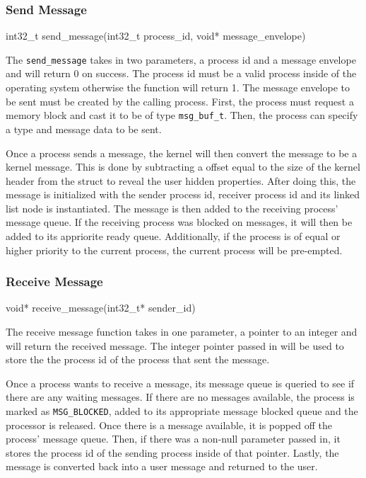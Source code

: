 \documentclass[se]{uw-wkrpt}
\begin{document}
\subsubsection{Send Message}

\begin{code}
int32_t send_message(int32_t process_id, void* message_envelope)
\end{code}

The \texttt{send\_message} takes in two parameters, a process id and a message envelope and will return 0 on success. The process id must be a valid process inside of the operating system otherwise the function will return 1. The message envelope to be sent must be created by the calling process. First, the process must request a memory block and cast it to be of type \texttt{msg\_buf\_t}. Then, the process can specify a type and message data to be sent.

Once a process sends a message, the kernel will then convert the message to be a kernel message. This is done by subtracting a offset equal to the size of the kernel header from the struct to reveal the user hidden properties. After doing this, the message is initialized with the sender process id, receiver process id and its linked list node is instantiated. The message is then added to the receiving process' message queue. If the receiving process was blocked on messages, it will then be added to its appriorite ready queue. Additionally, if the process is of equal or higher priority to the current process, the current process will be pre-empted.

\subsubsection{Receive Message}

\begin{code}
void* receive_message(int32_t* sender_id)
\end{code}

The receive message function takes in one parameter, a pointer to an integer and will return the received message. The integer pointer passed in will be used to store the the process id of the process that sent the message. 

Once a process wants to receive a message, its message queue is queried to see if there are any waiting messages. If there are no messages available, the process is marked as \texttt{MSG\_BLOCKED}, added to its appropriate message blocked queue and the processor is released. Once there is a message available, it is popped off the process' message queue. Then, if there was a non-null parameter passed in, it stores the process id of the sending process inside of that pointer. Lastly, the message is converted back into a user message and returned to the user.
\end{document}
